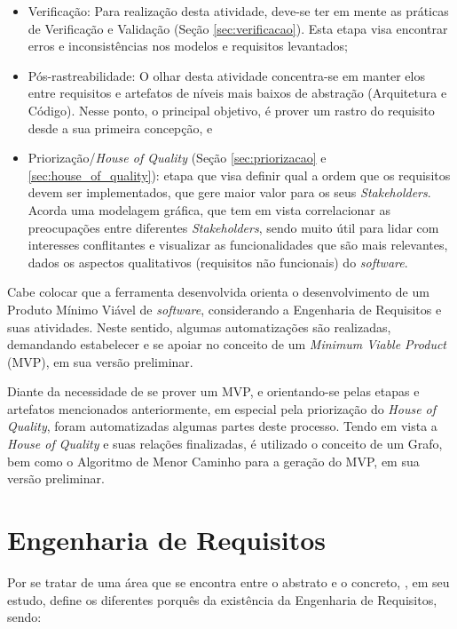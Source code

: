 \begin{itemize}
    \item Verificação: Para realização desta atividade, deve-se ter em mente as práticas de Verificação e Validação (Seção \ref{sec:verificacao}). Esta etapa visa encontrar erros e inconsistências nos modelos e requisitos levantados;
    
    \item Pós-rastreabilidade: O olhar desta atividade concentra-se em manter elos entre requisitos e artefatos de níveis mais baixos de abstração (Arquitetura e Código). Nesse ponto, o principal objetivo, é prover um rastro do requisito desde a sua primeira concepção, e
    
    \item Priorização/\textit{House of Quality} (Seção \ref{sec:priorizacao} e \ref{sec:house_of_quality}): etapa que visa definir qual a ordem que os requisitos devem ser implementados, que gere maior valor para os seus \textit{Stakeholders}. Acorda uma modelagem gráfica, que tem em vista correlacionar as preocupações entre diferentes \textit{Stakeholders}, sendo muito útil para lidar com interesses conflitantes e visualizar as funcionalidades que são mais relevantes, dados os aspectos qualitativos (requisitos não funcionais) do \textit{software}.
    
\end{itemize}

Cabe colocar que a ferramenta desenvolvida orienta o desenvolvimento de um Produto Mínimo Viável de \textit{software}, considerando a Engenharia de Requisitos e suas atividades. Neste sentido, algumas automatizações são realizadas, demandando estabelecer e se apoiar no conceito de um \textit{Minimum Viable Product} (MVP), em sua versão preliminar.

Diante da necessidade de se prover um MVP, e orientando-se pelas etapas e artefatos mencionados anteriormente, em especial pela priorização do \textit{House of Quality}, foram automatizadas algumas partes deste processo. Tendo em vista a \textit{House of Quality} e suas relações finalizadas, é utilizado o conceito de um Grafo, bem como o Algoritmo de Menor Caminho para a geração do MVP, em sua versão preliminar.

\section{Engenharia de Requisitos}

\label{sec:eng_requisitos_ex}

Por se tratar de uma área que se encontra entre o abstrato e o concreto, , em seu estudo, define os diferentes porquês da existência da Engenharia de Requisitos, sendo:

